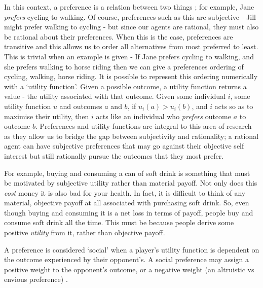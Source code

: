 \documentclass[11pt]{book}
\newcommand*{\np}{\par\noindent\newline}
\begin{document}
In this context, a preference is a relation between two things \citep{angner_course_2012}; for example, Jane \textit{prefers} cycling to walking. 
Of course, preferences such as this are subjective - Jill might prefer walking to cycling - but since our agents are rational, they must also be rational about their preferences. 
When this is the case, preferences are transitive and this allows us to order all alternatives from most preferred to least. 
This is trivial when an example is given - If Jane prefers cycling to walking, and she prefers walking to horse riding then we can give a preferences ordering of cycling, walking, horse riding.
It is possible to represent this ordering numerically with a `utility function'.
Given a possible outcome, a utility function returns a value - the utility associated with that outcome.
Given some individual $i$, some utility function $u$ and outcomes $a$ and $b$, 
if $u_i(a) > u_i(b)$, and $i$ acts so as to maximise their utility, then $i$ acts like an individual who \textit{prefers} outcome $a$ to outcome $b$.
Preferences and utility functions are integral to this area of research as they allow us to bridge the gap between subjectivity and rationality; 
a rational agent can have subjective preferences that may go against their objective self interest but still rationally pursue the outcomes that they most prefer.

For example, buying and consuming a can of soft drink is something that must be motivated by subjective utility rather than material payoff. 
Not only does this \textit{cost} money it is also bad for your health. 
In fact, it is difficult to think of any material, objective payoff at all associated with purchasing soft drink. 
So, even though buying and consuming it is a net loss in terms of payoff, people buy and consume soft drink all the time. 
This must be because people derive some positive \textit{utility} from it, rather than objective payoff.

\np A preference is considered `social' when a player's utility function is dependent on the outcome experienced by their opponent's. 
A social preference may assign a positive weight to the opponent's outcome, or a negative weight (an altruistic vs envious preference) \cite{angner_course_2012}.
\end{document}
